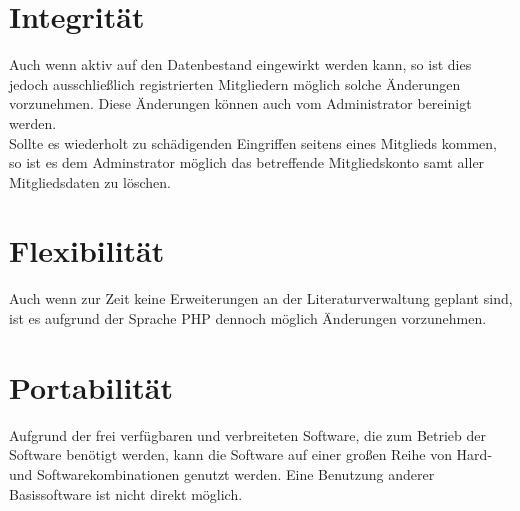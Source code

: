 \section{Integrität}
Auch wenn aktiv auf den Datenbestand eingewirkt werden kann, so ist dies jedoch ausschlie\ss lich registrierten Mitgliedern m\"oglich solche \"Anderungen vorzunehmen.
Diese \"Anderungen k\"onnen auch vom Administrator bereinigt werden.\\
Sollte es wiederholt zu sch\"adigenden Eingriffen seitens eines Mitglieds kommen, so ist es dem Adminstrator möglich das betreffende Mitgliedskonto samt aller Mitgliedsdaten zu l\"oschen.

\section{Flexibilität}
Auch wenn zur Zeit keine Erweiterungen an der Literaturverwaltung geplant sind, ist es aufgrund der Sprache PHP dennoch m\"oglich \"Anderungen vorzunehmen.

\section{Portabilität}
Aufgrund der frei verfügbaren und verbreiteten Software, die zum Betrieb der Software benötigt werden, kann die Software auf einer großen Reihe von Hard- und Softwarekombinationen genutzt werden. Eine Benutzung anderer Basissoftware ist nicht direkt möglich.
